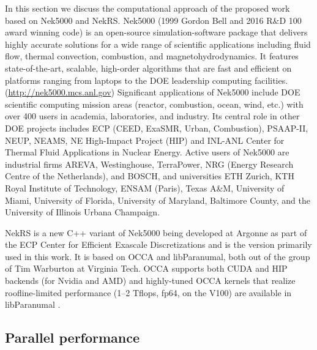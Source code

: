 In this section we discuss the computational approach of the proposed work based on Nek5000 and NekRS.
%
Nek5000 (1999 Gordon Bell and 2016 R\&D 100 award winning code) is an
open-source simulation-software package that delivers highly accurate solutions
for a wide range of scientific applications including fluid flow, thermal
convection, combustion, and magnetohydrodynamics. It features state-of-the-art,
scalable, high-order algorithms that are fast and efficient on platforms
ranging from laptops to the DOE leadership computing facilities.
({\footnotesize\url{http://nek5000.mcs.anl.gov}})
   Significant applications of Nek5000 include DOE scientific
computing mission areas (reactor, combustion, ocean, wind, etc.) with over 400
users in academia, laboratories, and industry. Its central role in other DOE
projects includes  ECP (CEED, ExaSMR, Urban, Combustion), PSAAP-II, NEUP, NEAMS, NE
High-Impact Project (HIP) and  INL-ANL Center for Thermal Fluid Applications in
Nuclear Energy.
   Active users of Nek5000 are industrial firms AREVA, Westinghouse,
TerraPower, NRG (Energy Research Centre of the Netherlands), and BOSCH, and
universities ETH Zurich, KTH Royal Institute of Technology, ENSAM (Paris),
Texas A\&M, University of Miami, University of Florida, University of Maryland,
Baltimore County, and the University of Illinois Urbana Champaign.

NekRS is a new C++ variant of Nek5000 being developed at Argonne as part of the
ECP Center for Efficient Exascale Discretizations and is the version primarily
used in this work.  It is based
on OCCA and libParanumal, both out of the group of Tim Warburton at
Virginia Tech.  OCCA supports both CUDA and HIP backends (for Nvidia and AMD)
and highly-tuned OCCA kernels that realize roofline-limited performance
(1--2 Tflops, fp64, on the V100) are available in libParanumal \cite{fischer20a}.

\vspace{-.25in}
\subsection{Parallel performance}
\vspace{-.2in}

